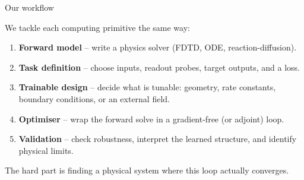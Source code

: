 \documentclass[aspectratio=169,11pt]{beamer}
\begin{document}
\begin{frame}{Our workflow}

We tackle each computing primitive the same way:

\vspace{0.3cm}
\begin{enumerate}
    \item \textbf{Forward model} -- write a physics solver (FDTD, ODE, reaction-diffusion).
    \item \textbf{Task definition} -- choose inputs, readout probes, target outputs, and a loss.
    \item \textbf{Trainable design} -- decide what is tunable: geometry, rate constants, boundary conditions, or an external field.
    \item \textbf{Optimiser} -- wrap the forward solve in a gradient-free (or adjoint) loop.
    \item \textbf{Validation} -- check robustness, interpret the learned structure, and identify physical limits.
\end{enumerate}

\vspace{0.3cm}
\centering
The hard part is finding a physical system where this loop actually converges.

\end{frame}
\end{document}
